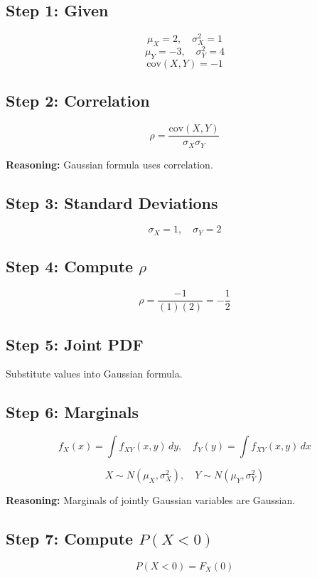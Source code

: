 \documentclass[12pt]{article}
\begin{document}
\subsection*{Step 1: Given}

\[
\mu_X = 2, \quad \sigma_X^2 = 1
\]
\[
\mu_Y = -3, \quad \sigma_Y^2 = 4
\]
\[
\text{cov}(X,Y) = -1
\]

\subsection*{Step 2: Correlation}

\[
\rho = \frac{\text{cov}(X,Y)}{\sigma_X \sigma_Y}
\]

\textbf{Reasoning:} Gaussian formula uses correlation.

\subsection*{Step 3: Standard Deviations}

\[
\sigma_X = 1, \quad \sigma_Y = 2
\]

\subsection*{Step 4: Compute $\rho$}

\[
\rho = \frac{-1}{(1)(2)} = -\frac{1}{2}
\]

\subsection*{Step 5: Joint PDF}

Substitute values into Gaussian formula.

\subsection*{Step 6: Marginals}

\[
f_X(x) = \int f_{XY}(x,y)\,dy, \quad
f_Y(y) = \int f_{XY}(x,y)\,dx
\]

\[
X \sim N(\mu_X, \sigma_X^2), \quad Y \sim N(\mu_Y, \sigma_Y^2)
\]

\textbf{Reasoning:} Marginals of jointly Gaussian variables are Gaussian.

\subsection*{Step 7: Compute $P(X < 0)$}

\[
P(X < 0) = F_X(0)
\]
\end{document}
